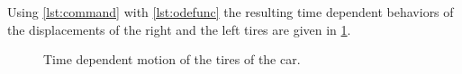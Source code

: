\documentclass[]{report}
\begin{document}
\newpage
\lstset{frame=single,numbers=left}

~\\~\\
Using \cref{lst:command} with \cref{lst:odefunc} the resulting time dependent behaviors of the displacements of the right and the left tires are given in \cref{fig:timedependenttires}.
\begin{figure}[ht!]

\caption{Time dependent motion of the tires of the car.}
\label{fig:timedependenttires}
\end{figure}




\end{document}
